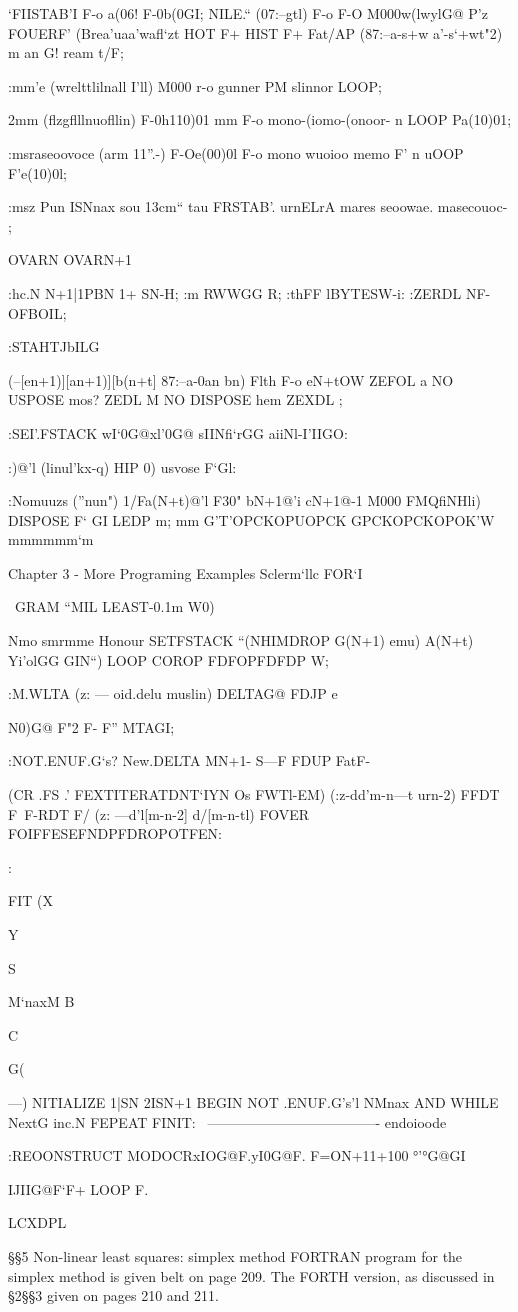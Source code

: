 {{{{{{‘FIISTAB’I F-o a(0}6! F-0b(0}GI;
NILE.“ (07:--g{{tl}}) F-o F-O
M000w(l}wy{l}G@ P'z FOUERF'
(Brea'uaa'waﬂ‘zt
HOT F+ HIST F+ Fat/AP
(87:--a-s+w a’-s‘+wt"2)
m an G! ream t/F;

 

:mm'e (wrelttlilnall I'll)
M000 r-o gunner PM slinnor LOOP;

2mm (ﬂzgﬂllnuoﬂlin)
F-0h110)01 mm
F-o mono-(iomo-(onoor- n LOOP
Pa(10)01;

:msraseoovoce (arm 11”.-)
F-Oe(00)0l F-o
mono wuoioo memo F' n uOOP
F'e(10)0l;

:msz Pun ISNnax sou 13cm“ tau
FRSTAB'. urnELrA mares seoowae.
masecouoc- ;

OVARN OVARN+1

:hc.N N+1|1PBN 1+ SN-H;
:m RWWGG R;
:thFF lBYTESW-i:
:ZERDL NF-OFBOIL;

:STAHTJbILG

(--[e{n+1)][a{n+1)][b(n+t}] 87:--a-0a{n} b{n})
Flth F-o e{N+tO}W ZEFOL
a{ NO} USPOSE mos? ZEDL
M NO} DISPOSE hem ZEXDL ;

:SEI’.FSTACK w{I‘0}G@x{l'0}G@ sIINfi‘rGG
aiiNl-I'IIGO:

:)@'l (linul'kx-q) HIP 0) usvose F‘Gl:

:Nomuuzs (”nun")
1/Fa(N+t)@'l F30"
b{N+1}@'i c{N+1}@-1
M000 FMQﬁNHli) DISPOSE F‘ GI LEDP
m;
mm G'T'OPCKOPUOPCK
GPCKOPCKOPOK'W
mmmmmm‘m

Chapter 3 - More Programing Examples Sclerm‘llc FOR‘I

\ GRAM “MIL LEAST-0.1m W0)

Nmo smrmme
Honour SETFSTACK
“(NHIMDROP G(N+1) emu) A(N+t)
Yi'olGG GIN“)
LOOP COROP FDFOPFDFDP W;

:M.WLTA (z: — oid.delu muslin)
DELTAG@ FDJP e{N0)G@ F"2 F- F”
MTAGI;

:NOT.ENUF.G‘s? New.DELTA MN+1- S—F
FDUP FatF-

(CR .FS .' FEXTITERATDNT‘IYN Os FWTl-EM)
(:z-dd'm-n—t urn-2)
FFDT F\ F-RDT F/ (z: —d'l[m-n-2] d/[m-n-tl)
FOVER FOIFFESEFNDPFDROPOTFEN:

:}FIT (X{Y{S{ M‘naxM B{ C{G({ —)
NITIALIZE 1|SN 2ISN+1
BEGIN NOT .ENUF.G's’l NMnax AND
WHILE NextG inc.N
FEPEAT FINIT:
\ ------------------------------------- endoioode

:REOONSTRUCT MODOCRx{IO}G@F.y{I0}G@F.
F=ON+11+100
°{'°}G@GI{IJIIG@F‘F+
LOOP F.

LCXDPL

§§5 Non-linear least squares: simplex method
FORTRAN program for the simplex method is given belt
on page 209. The FORTH version, as discussed in §2§§3
given on pages 210 and 211.

}}}}}}}}}}
